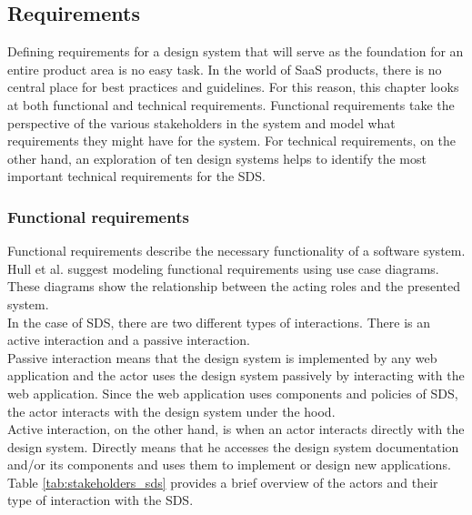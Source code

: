\subsection{Requirements}\label{sds_requirements}
Defining requirements for a design system that will serve as the foundation for an entire product area is no easy task. In the world of \ac{SaaS} products, there is no central place for best practices and guidelines. For this reason, this chapter looks at both functional and technical requirements. Functional requirements take the perspective of the various stakeholders in the system and model what requirements they might have for the system. For technical requirements, on the other hand, an exploration of ten design systems helps to identify the most important technical requirements for the \ac{SDS}.
\subsubsection{Functional requirements}
Functional requirements describe the necessary functionality of a software system. Hull et al. suggest modeling functional requirements using use case diagrams. These diagrams show the relationship between the acting roles and the presented system.\cite{hull_requirements_2011} \\
In the case of \ac{SDS}, there are two different types of interactions. There is an active interaction and a passive interaction. \\
Passive interaction means that the design system is implemented by any web application and the actor uses the design system passively by interacting with the web application. Since the web application uses components and policies of \ac{SDS}, the actor interacts with the design system under the hood. \\
Active interaction, on the other hand, is when an actor interacts directly with the design system. Directly means that he accesses the design system documentation and/or its components and uses them to implement or design new applications. \\
Table \ref{tab:stakeholders_sds} provides a brief overview of the actors and their type of interaction with the \ac{SDS}.
